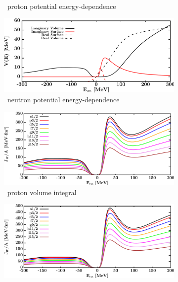 \begin{figure}[hbtp]
\begin{subfigure}[b]{0.45\textwidth}
        \caption{\oEight\ proton potential energy-dependence}
        \label{DOMFitData_o18_proton_potentialComponent_energy}
    \end{subfigure}\hspace{6pt}
    \begin{subfigure}[b]{0.45\linewidth}
        \centering
        \includegraphics[width=\linewidth]{figures/o18_neutronPotentials.png}
        \caption{\oEight\ neutron potential energy-dependence}
        \label{DOMFitData_o18_neutron_potentialComponent_energy}
    \end{subfigure}\vspace{0.3in}
    \begin{subfigure}[b]{0.45\textwidth}
        \centering
        \includegraphics[width=\linewidth]{figures/o18_protonVolumeIntegrals.png}
        \caption{\oEight\ proton volume integral}
        \label{DOMFitData_o18_proton_potentialIntegral}
    \end{subfigure}\hspace{6pt}
    \begin{subfigure}[b]{0.45\textwidth}
        \centering
        \includegraphics[width=\linewidth]{figures/o18_neutronVolumeIntegrals.png}

\end{subfigure}
\end{figure}
